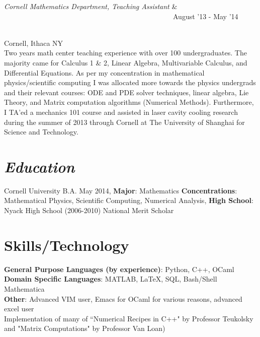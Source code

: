 \documentclass{res}
\begin{document}
{\begin{resume}
\begin{ncolumn}{2}
{\it Cornell Mathematics Department, Teaching Assistant} & ~~~~~~~~~~~~~~~~~~~~~~~~~~~~~~~~~~~~~~~~~~~~~~~~August '13 - May '14
\end{ncolumn}\\
Cornell, Ithaca NY\\
Two years math center teaching experience with over 100 undergraduates. The majority came for Calculus 1 \& 2, Linear Algebra, Multivariable Calculus, and Differential Equations. As per my concentration in mathematical physics/scientific computing I was allocated more towards the physics undergrads and their relevant courses: ODE and PDE solver techniques, linear algebra, Lie Theory, and Matrix computation algorithms (Numerical Methods). Furthermore, I TA'ed a mechanics 101 course and assisted in laser cavity cooling research during the summer of 2013 through Cornell at The University of Shanghai for Science and Technology.

\section{\sl\bf  Education}
Cornell University B.A. May 2014,
\textbf{Major}: Mathematics \textbf{Concentrations}: Mathematical
Physics, Scientific Computing, Numerical Analysis, \textbf{High School}: Nyack High School (2006-2010) National Merit Scholar

\section{\textbf{Skills/Technology}}
{\bf General Purpose Languages (by experience)}: Python, C++, OCaml\\
{\bf Domain Specific Languages}: MATLAB, LaTeX, SQL, Bash/Shell Mathematica\\
{\bf Other}: Advanced VIM user, Emacs for OCaml for various reasons, advanced
excel user\\
Implementation of many of ``Numerical Recipes in C++" by Professor Teukolsky and "Matrix Computations" by Professor Van Loan)


\end{resume}}
\end{document}
